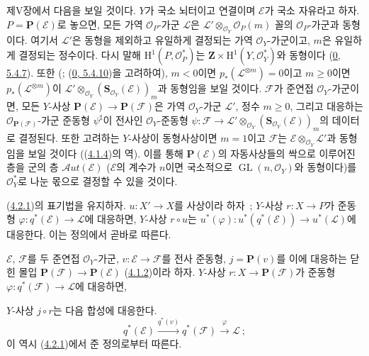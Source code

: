 \begin{remark}[4.2.7]
\label{II.4.2.7-ko}
제V장에서 다음을 보일 것이다. $Y$가 국소 뇌터이고 연결이며
$\mathcal{E}$가 국소 자유라고 하자. $P=\mathbf{P}(\mathcal{E})$로 놓으면,
모든 가역 $\mathcal{O}_P$-가군 $\mathcal{L}$은
$\mathcal{L}'\otimes_{\mathcal{O}_Y}\mathcal{O}_P(m)$ 꼴의
$\mathcal{O}_P$-가군과 동형이다. 여기서 $\mathcal{L}'$은 동형을
제외하고 유일하게 결정되는 가역 $\mathcal{O}_Y$-가군이고, $m$은
유일하게 결정되는 정수이다. 다시 말해
$\mathrm{H}^1(P,\mathcal{O}_P^*)$는
$\mathbf{Z}\times\mathrm{H}^1(Y,\mathcal{O}_Y^*)$와 동형이다
(\hyperref[0.5.4.7-ko]{0, 5.4.7}). 또한
(;
(\hyperref[0.5.4.10-ko]{0, 5.4.10})을 고려하여),
$m<0$이면 $p_*(\mathcal{L}^{\otimes m})=0$이고 $m\geq0$이면
$p_*(\mathcal{L}^{\otimes m})$이
$\mathcal{L}'\otimes_{\mathcal{O}_Y}
(\mathbf{S}_{\mathcal{O}_Y}(\mathcal{E}))_m$과 동형임을 보일 것이다.
$\mathcal{F}$가 준연접 $\mathcal{O}_Y$-가군이면, 모든 $Y$-사상
$\mathbf{P}(\mathcal{E})\to\mathbf{P}(\mathcal{F})$은 가역
$\mathcal{O}_Y$-가군 $\mathcal{L}'$, 정수 $m\geq0$, 그리고 대응하는
$\mathcal{O}_{\mathbf{P}(\mathcal{F})}$-가군 준동형 $\psi^\sharp$이
전사인 $\mathcal{O}_Y$-준동형
$\psi:\mathcal{F}\to\mathcal{L}'\otimes_{\mathcal{O}_Y}
(\mathbf{S}_{\mathcal{O}_Y}(\mathcal{E}))_m$의 데이터로 결정된다. 또한
고려하는 $Y$-사상이 동형사상이면 $m=1$이고 $\mathcal{F}$는
$\mathcal{E}\otimes_{\mathcal{O}_Y}\mathcal{L}'$과 동형임을 보일 것이다
((\hyperref[II.4.1.4-ko]{4.1.4})의 역). 이를 통해
$\mathbf{P}(\mathcal{E})$의 자동사상들의 싹으로 이루어진 층을 군의 층
$\mathcal{A}ut(\mathcal{E})$ ($\mathcal{E}$의 계수가 $n$이면 국소적으로
$\operatorname{GL}(n,\mathcal{O}_Y)$와 동형이다)를
$\mathcal{O}_Y^*$로 나눈 몫으로 결정할 수 있을 것이다.
\end{remark}

\begin{env}[4.2.8]
\label{II.4.2.8-ko}
(\hyperref[II.4.2.1-ko]{4.2.1})의 표기법을 유지하자. $u:X'\to X$를
사상이라 하자~; $Y$-사상 $r:X\to P$가 준동형
$\varphi:q^*(\mathcal{E})\to\mathcal{L}$에 대응하면, $Y$-사상
$r\circ u$는
$u^*(\varphi):u^*(q^*(\mathcal{E}))\to u^*(\mathcal{L})$에 대응한다.
이는 정의에서 곧바로 따른다.
\end{env}

\begin{env}[4.2.9]
\label{II.4.2.9-ko}
$\mathcal{E}$, $\mathcal{F}$를 두 준연접 $\mathcal{O}_Y$-가군,
$v:\mathcal{E}\to\mathcal{F}$를 전사 준동형, $j=\mathbf{P}(v)$를 이에
대응하는 닫힌 몰입
$\mathbf{P}(\mathcal{F})\to\mathbf{P}(\mathcal{E})$
(\hyperref[II.4.1.2-ko]{4.1.2})이라 하자. $Y$-사상
$r:X\to\mathbf{P}(\mathcal{F})$가 준동형
$\varphi:q^*(\mathcal{F})\to\mathcal{L}$에 대응하면,


$Y$-사상 $j\circ r$는 다음 합성에 대응한다.
\[
  q^*(\mathcal{E})\xrightarrow{q^*(v)}q^*(\mathcal{F})
  \xrightarrow{\varphi}\mathcal{L}~;
\]
이 역시 (\hyperref[II.4.2.1-ko]{4.2.1})에서 준 정의로부터 따른다.
\end{env}

